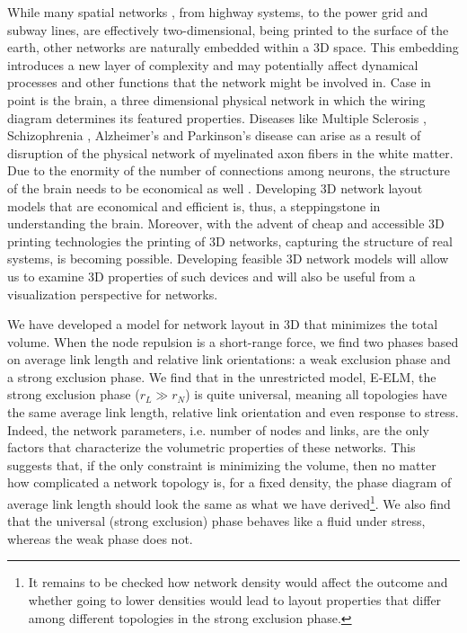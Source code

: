 \documentclass[nofootinbib,preprint,floatfix,titlepage,endfloats]{revtex4} %
\begin{document}

While many spatial networks \cite{barthelemy2011spatial}, from highway systems, to the power grid and subway lines, are effectively two-dimensional, 
being printed to the surface of the earth, other networks are naturally embedded within a 3D space. 
This embedding introduces a new layer of complexity and may potentially affect dynamical processes and other functions that the network might be involved in. Case in point is the brain, a three dimensional physical network in which the wiring diagram determines its featured properties. 
Diseases like Multiple Sclerosis \cite{compston2008ms,miller2007ms,miller2005ms}, Schizophrenia \cite{davis2003white,lim1999compromised,sigmundsson2001structural}, Alzheimer's \cite{mudher2002alzheimer,goedert1991tau,goedert1992tau} and Parkinson's disease \cite{bohnen2011white,beyer2006visual,hattori2012cognitive} can arise as a result of disruption of the physical network of myelinated axon fibers in the white matter. 
Due to the enormity of the number of connections among neurons, the structure of the brain needs to be economical as well \cite{bullmore2012economy,sporns2004organization,kotter2001connectional}. Developing 3D network layout models that are economical and efficient is, thus, a steppingstone in understanding the brain. 
Moreover, with the advent of cheap and accessible 3D printing technologies the printing of 3D networks, capturing the structure of real systems, is becoming possible. 
Developing feasible 3D network models will allow us to examine 3D properties of such devices and will also be useful from a visualization perspective for networks.

We have developed a model for network layout in 3D that minimizes the total volume. 
When the node repulsion is a short-range force, we find two phases based on average link length and relative link orientations: a weak exclusion phase and a strong exclusion phase. 
We find that in the unrestricted model, E-ELM, the strong exclusion phase ($r_L \gg r_N$) is quite universal, meaning all topologies have the same average link length, relative link orientation and even response to stress. 
Indeed, the network parameters, i.e. number of nodes and links, are the only factors that characterize the volumetric properties of these networks. 
This suggests that, if the only constraint is minimizing the volume, then no matter how complicated a network topology is, for a fixed density, the phase diagram of average link length should look the same as what we have derived\footnote{
It remains to be checked how network density would affect the outcome and whether going to lower densities would lead to layout properties that differ among different topologies in the strong exclusion phase.}.
We also find that the universal (strong exclusion) phase behaves like a fluid under stress, whereas the weak phase does not. 
\end{document}
